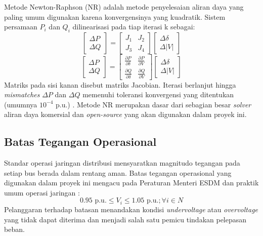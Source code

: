 Metode Newton-Raphson (NR) adalah metode penyelesaian aliran daya yang paling umum digunakan karena konvergensinya yang kuadratik. Sistem persamaan $P_{i}$ dan $Q_{i}$ dilinearisasi pada tiap iterasi k sebagai:
\begin{equation}
    \begin{bmatrix} \Delta P \\ \Delta Q \end{bmatrix} = \begin{bmatrix} J_{1} & J_{2} \\ J_{3} & J_{4} \end{bmatrix} \begin{bmatrix} \Delta\delta \\ \Delta|V| \end{bmatrix}
\end{equation}
\begin{equation}
    \begin{bmatrix} \Delta P \\ \Delta Q \end{bmatrix} = \begin{bmatrix} \frac{\partial P}{\partial\delta} & \frac{\partial P}{\partial V} \\ \frac{\partial Q}{\partial\delta} & \frac{\partial Q}{\partial V} \end{bmatrix} \begin{bmatrix} \Delta\delta \\ \Delta|V| \end{bmatrix}
\end{equation}
Matriks pada sisi kanan disebut matriks Jacobian. Iterasi berlanjut hingga \textit{mismatches} $\Delta P$ dan $\Delta Q$ memenuhi toleransi konvergensi yang ditentukan (umumnya $10^{-4} \text{ p.u.}$) \cite{Bergen2000}. Metode NR merupakan dasar dari sebagian besar \textit{solver} aliran daya komersial dan \textit{open-source} yang akan digunakan dalam proyek ini.

\subsection{Batas Tegangan Operasional}
\label{subsec:Batas_Tegangan_Operasional}

Standar operasi jaringan distribusi mensyaratkan magnitudo tegangan pada setiap bus berada dalam rentang aman. Batas tegangan operasional yang digunakan dalam proyek ini mengacu pada Peraturan Menteri ESDM dan praktik umum operasi jaringan \cite{PermenESDM2007}:
\begin{equation}
    0.95 \text{ p.u.} \le V_{i} \le 1.05 \text{ p.u.}; \forall i \in N
\end{equation}
Pelanggaran terhadap batasan menandakan kondisi \textit{undervoltage} atau \textit{overvoltage} yang tidak dapat diterima dan menjadi salah satu pemicu tindakan pelepasan beban.

